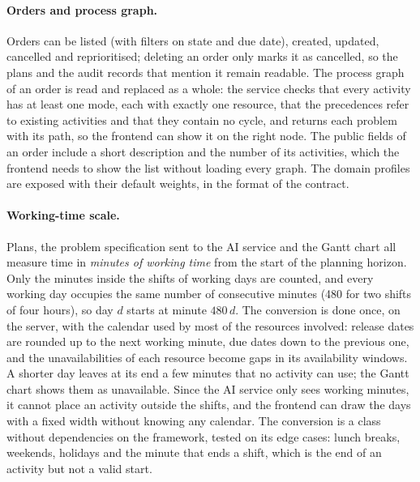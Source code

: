 \paragraph{Orders and process graph.} Orders can be listed (with filters on state and due date),
created, updated, cancelled and reprioritised; deleting an order only marks it as cancelled, so
the plans and the audit records that mention it remain readable. The process graph of an order
is read and replaced as a whole: the service checks that every activity has at least one mode,
each with exactly one resource, that the precedences refer to existing activities and that they
contain no cycle, and
returns each problem with its path, so the frontend can show it on the right node. The public
fields of an order include a short description and the number of its activities, which the
frontend needs to show the list without loading every graph. The domain profiles are exposed
with their default weights, in the format of the contract.

\paragraph{Working-time scale.} Plans, the problem specification sent to the AI service and the
Gantt chart all measure time in \emph{minutes of working time} from the start of the planning
horizon. Only the minutes inside the shifts of working days are counted, and every working day
occupies the same number of consecutive minutes (480 for two shifts of four hours), so day $d$
starts at minute $480\,d$. The conversion is done once, on the server, with the calendar used by
most of the resources involved: release dates are rounded up to the next working minute, due
dates down to the previous one, and the unavailabilities of each resource become gaps in its
availability windows. A shorter day leaves at its end a few minutes that no activity can use;
the Gantt chart shows them as unavailable. Since the AI service only sees working minutes, it
cannot place an activity outside the shifts, and the frontend can draw the days with a fixed
width without knowing any calendar. The conversion is a class without dependencies on the
framework, tested on its edge cases: lunch breaks, weekends, holidays and the minute that ends a
shift, which is the end of an activity but not a valid start.

